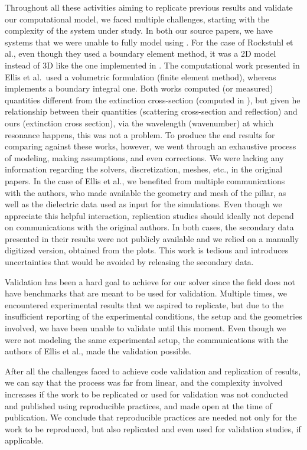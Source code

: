 
Throughout all these activities aiming to replicate previous results and validate our computational model, we faced multiple challenges, starting with the complexity of the system under study. In both our source papers, we have systems that we were unable to fully 
model using \pygbe. For the case of Rockstuhl et al., even though they used a boundary element method, it was a 2D model instead of 3D like the one implemented in \pygbe. The computational work presented in Ellis et al.\ used a volumetric 
formulation (finite element method), whereas \pygbe implements a boundary integral one. Both works computed (or measured) quantities different from the extinction cross-section (computed in \pygbe), but given he relationship between their quantities (scattering cross-section and reflection)  
and ours (extinction cross section), via the wavelength (wavenumber) at which resonance happens, this was not a problem. To produce the end results for comparing against these works, however, we went through an 
exhaustive process of modeling, making assumptions, and even corrections. We were lacking any information regarding the solvers, discretization, meshes, etc., in the original papers. In the case of Ellis et al., we benefited from multiple communications with the authors, 
who made available the geometry and mesh of the pillar, as well as the dielectric data used as input for the simulations. Even though we appreciate this helpful interaction, replication studies should ideally not depend on communications with the original authors. 
In both cases, the secondary data presented in their results were not publicly available and we relied on a manually digitized version, obtained from the plots. This work is tedious and introduces uncertainties that would be avoided by releasing 
the secondary data.

Validation has been a hard goal to achieve for our solver since the field does not have benchmarks that are meant to be used for validation. Multiple times,
we encountered experimental results that we aspired to replicate, but due to the insufficient reporting of the experimental conditions, the setup and the geometries involved, 
we have been unable to validate until this moment. Even though we were not modeling the same experimental setup, the communications with the authors of Ellis et al., made 
the validation possible.

After all the challenges faced to achieve code validation and replication of results, we can say that the process was far from  linear, 
and the complexity involved increases if the work to be replicated or used for validation was not conducted and published using reproducible practices, and made open at the time 
of publication. We conclude that reproducible practices are needed not only for the work to be reproduced, but also 
replicated and even used for validation studies, if applicable.
